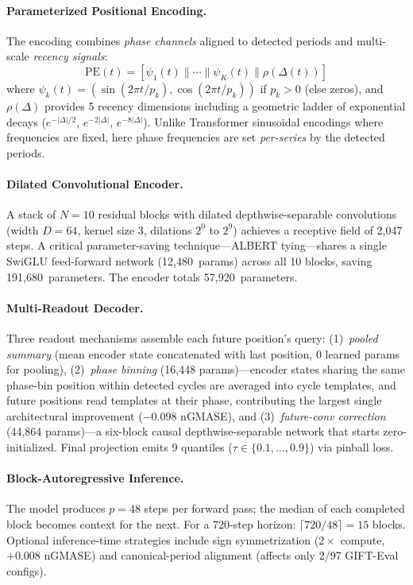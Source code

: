 \documentclass[11pt,a4paper]{article}
\begin{document}
\paragraph{Parameterized Positional Encoding.} The encoding combines \emph{phase channels} aligned to detected periods and multi-scale \emph{recency signals}:
\begin{equation}
\text{PE}(t) = [\psi_1(t) \| \cdots \| \psi_K(t) \| \rho(\Delta(t))]
\end{equation}
where $\psi_k(t) = (\sin(2\pi t/p_k), \cos(2\pi t/p_k))$ if $p_k > 0$ (else zeros), and $\rho(\Delta)$ provides 5 recency dimensions including a geometric ladder of exponential decays ($e^{-|\Delta|/2}$, $e^{-2|\Delta|}$, $e^{-8|\Delta|}$). Unlike Transformer sinusoidal encodings where frequencies are fixed, here phase frequencies are set \emph{per-series} by the detected periods.

\paragraph{Dilated Convolutional Encoder.} A stack of $N{=}10$ residual blocks with dilated depthwise-separable convolutions (width $D{=}64$, kernel size 3, dilations $2^0$ to $2^9$) achieves a receptive field of 2,047 steps. A critical parameter-saving technique---ALBERT tying---shares a single SwiGLU feed-forward network (12,480~params) across all 10 blocks, saving 191,680~parameters. The encoder totals 57,920~parameters.

\paragraph{Multi-Readout Decoder.} Three readout mechanisms assemble each future position's query: (1)~\emph{pooled summary} (mean encoder state concatenated with last position, 0 learned params for pooling), (2)~\emph{phase binning} (16,448 params)---encoder states sharing the same phase-bin position within detected cycles are averaged into cycle templates, and future positions read templates at their phase, contributing the largest single architectural improvement ($-0.098$ nGMASE), and (3)~\emph{future-conv correction} (44,864 params)---a six-block causal depthwise-separable network that starts zero-initialized. Final projection emits 9 quantiles ($\tau \in \{0.1, \ldots, 0.9\}$) via pinball loss.

\paragraph{Block-Autoregressive Inference.} The model produces $p{=}48$ steps per forward pass; the median of each completed block becomes context for the next. For a 720-step horizon: $\lceil 720/48 \rceil = 15$ blocks. Optional inference-time strategies include sign symmetrization ($2\times$ compute, $+0.008$ nGMASE) and canonical-period alignment (affects only 2/97 GIFT-Eval configs).
\end{document}
